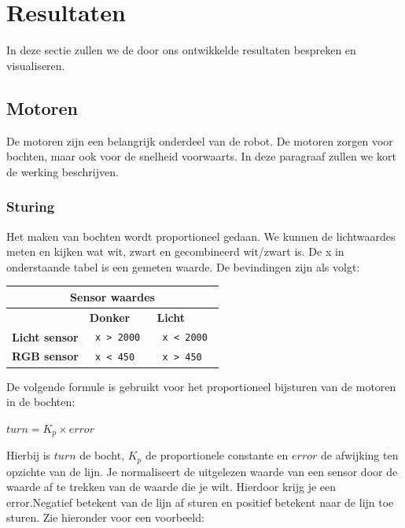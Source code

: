 \documentclass[12pt]{article}
\begin{document}
\section{Resultaten}
	In deze sectie zullen we de door ons ontwikkelde resultaten bespreken en visualiseren.
	\subsection{Motoren}
	De motoren zijn een belangrijk onderdeel van de robot. De motoren zorgen voor bochten, maar ook voor de snelheid voorwaarts. In deze paragraaf zullen we kort de werking beschrijven.
		\subsubsection{Sturing}
			Het maken van bochten wordt proportioneel gedaan. We kunnen de lichtwaardes meten en kijken wat wit, zwart en gecombineerd wit/zwart is. De x in onderstaande tabel is een gemeten waarde. De bevindingen zijn als volgt:
			\begin{center}
				\begin{tabular}{ | p{3cm} | p{2cm}| p{2cm} | }
					\hline
					\multicolumn{3}{|c|}{ \textbf{Sensor waardes} } \\
					\hline
					& \textbf{Donker} & \textbf{Licht} \\ 
					\hline
					\textbf{Licht sensor} & \texttt{ x > 2000 } & \texttt{ x < 2000 } \\ 
					\hline
					\textbf{RGB sensor} & \texttt{ x < 450 } & \texttt{ x > 450 } \\ 
					\hline
				\end{tabular}
			\end{center}
		De volgende formule is gebruikt voor het proportioneel bijsturen van de motoren in de bochten:
		\begin{center}
			\Large $turn = K_{p} \times error$
		\end{center}
		Hierbij is $turn$ de bocht, $K_{p}$ de proportionele constante en $error$ de afwijking ten opzichte van de lijn.
		Je normaliseert de uitgelezen waarde van een sensor door de waarde af te trekken van de waarde die je wilt. Hierdoor krijg je een error.\newpage Negatief betekent van de lijn af sturen en positief betekent naar de lijn toe sturen. Zie hieronder voor een voorbeeld:
\end{document}
